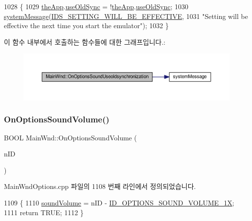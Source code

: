 \begin{DoxyCode}
1028 \{
1029   \mbox{\hyperlink{_v_b_a_8cpp_a8095a9d06b37a7efe3723f3218ad8fb3}{theApp}}.\mbox{\hyperlink{class_v_b_a_a8a4b36a4e6259df18baf03360aacad4b}{useOldSync}} = !\mbox{\hyperlink{_v_b_a_8cpp_a8095a9d06b37a7efe3723f3218ad8fb3}{theApp}}.\mbox{\hyperlink{class_v_b_a_a8a4b36a4e6259df18baf03360aacad4b}{useOldSync}};
1030   \mbox{\hyperlink{system_8cpp_a747a9cb8e015a3d45cca636b5bd0fc69}{systemMessage}}(\mbox{\hyperlink{resource_8h_a81be97db8b1e8b89320bcc2208826a47}{IDS\_SETTING\_WILL\_BE\_EFFECTIVE}},
1031                 \textcolor{stringliteral}{"Setting will be effective the next time you start the emulator"});      
1032 \}
\end{DoxyCode}
이 함수 내부에서 호출하는 함수들에 대한 그래프입니다.\+:
\nopagebreak
\begin{figure}[H]
\begin{center}
\leavevmode
\includegraphics[width=350pt]{class_main_wnd_a58f33cfb8f434804b45d391e7a9a9427_cgraph}
\end{center}
\end{figure}
\mbox{\label{class_main_wnd_ae784df9d960de0aed023ebfdd444e979}} 
\subsubsection{\texorpdfstring{On\+Options\+Sound\+Volume()}{OnOptionsSoundVolume()}}
{\footnotesize\ttfamily B\+O\+OL Main\+Wnd\+::\+On\+Options\+Sound\+Volume (\begin{DoxyParamCaption}\item[{U\+I\+NT}]{n\+ID }\end{DoxyParamCaption})}



Main\+Wnd\+Options.\+cpp 파일의 1108 번째 라인에서 정의되었습니다.


\begin{DoxyCode}
1109 \{
1110   \mbox{\hyperlink{gb_sound_8cpp_a44346dfa73de6666c4727594bb20f6b7}{soundVolume}} = nID - \mbox{\hyperlink{resource_8h_ad321e1e7a049df3b4273c9872c5354fe}{ID\_OPTIONS\_SOUND\_VOLUME\_1X}};
1111   \textcolor{keywordflow}{return} TRUE;
1112 \}
\end{DoxyCode}
\mbox{\label{class_main_wnd_a023f468053008a509a35b2a08a7661ee}} 
